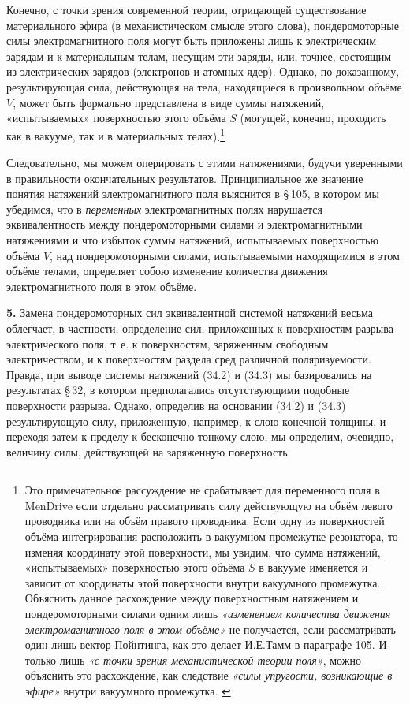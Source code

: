 \documentclass[a4paper,10pt]{article}
\newcommand{\redtext}[1]{\textcolor{redcolor}{#1}}
\newcommand{\modtext}[1]{\textcolor{modcolor}{#1}}
\begin{document}
Конечно, с точки зрения современной теории, \redtext{отрицающей существование
материального эфира} (в механистическом смысле этого слова),
пондеромоторные силы электромагнитного поля могут быть приложены лишь
к электрическим зарядам и к материальным телам, несущим эти заряды,
или, точнее, состоящим из электрических зарядов (электронов и атомных
ядер). \redtext{Однако, по доказанному, результирующая сила, действующая на
тела, находящиеся в произвольном объёме $V$, может быть формально
представлена в виде суммы натяжений, «испытываемых» поверхностью этого
объёма $S$ (могущей, конечно, проходить как в вакууме, так и
в материальных телах)}.\footnote{\modtext{Это примечательное рассуждение
не срабатывает для переменного поля в MenDrive если отдельно рассматривать
силу действующую на объём левого проводника или на объём правого проводника.
Если одну из поверхностей объёма интегрирования расположить в вакуумном промежутке
резонатора, то изменяя координату этой поверхности, мы увидим, что сумма натяжений,
«испытываемых» поверхностью этого
объёма $S$ в вакууме именяется и зависит от координаты этой поверхности внутри
вакуумного промежутка. Объяснить данное расхождение между поверхностным натяжением
и пондеромоторными силами одним лишь \textit{«изменением количества движения
электромагнитного поля в этом объёме»} не получается, если рассматривать
один лишь вектор Пойнтинга, как это делает И.Е.Тамм в параграфе 105.
И только лишь \textit{«с точки зрения механистической теории поля»},
можно объяснить это расхождение, как следствие \textit{«силы упругости,
возникающие в эфире»} внутри вакуумного промежутка. }}

Следовательно, мы можем оперировать с этими
натяжениями, будучи уверенными в правильности окончательных результатов.
Принципиальное же значение понятия натяжений электромагнитного поля
выяснится в §\,105, в котором мы убедимся, что в \textit{переменных}
электромагнитных полях нарушается эквивалентность между пондеромоторными
силами и электромагнитными натяжениями и что избыток суммы натяжений,
испытываемых поверхностью объёма $V$, над пондеромоторными силами,
испытываемыми находящимися в этом объёме телами, определяет собою
изменение количества движения электромагнитного поля в этом объёме.

\textbf{5.} Замена пондеромоторных сил эквивалентной системой натяжений
весьма облегчает, в частности, определение сил, приложенных к
поверхностям разрыва электрического поля, т.\,е. к поверхностям,
заряженным свободным электричеством, и к поверхностям раздела сред
различной поляризуемости. Правда, при выводе системы натяжений (34.2)
и (34.3) мы базировались на результатах §\,32, в котором предполагались
отсутствующими подобные поверхности разрыва. Однако, определив на
основании (34.2) и (34.3) результирующую силу, приложенную, например,
к слою конечной толщины, и переходя затем к пределу к бесконечно
тонкому слою, мы определим, очевидно, величину силы, действующей на
заряженную поверхность.
\end{document}
